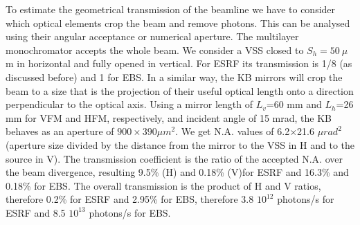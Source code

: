 \documentclass{iucr}              %
\newcommand{\todo}[1]{{\color{red}[TODO: "#1'']}}
\begin{document}
To estimate the geometrical transmission of the beamline we have to consider which optical elements crop the beam and remove photons. This can be analysed using their angular acceptance or numerical aperture. The multilayer monochromator accepts the whole beam. We consider a VSS closed to $S_h=50~\mu$m in horizontal and fully opened in vertical. For ESRF its transmission is 1/8 (as discussed before) and 1 for EBS. In a similar way, the KB mirrors will crop the beam to a size that is the projection of their useful optical length onto a direction perpendicular to the optical axis. Using a mirror length of $L_v$=60 mm and $L_h$=26 mm for VFM and HFM, respectively, and incident angle of 15 mrad, the KB behaves as an aperture of $900 \times 390 \mu m^2$. We get N.A. values of 6.2$\times$21.6 $\mu rad^2$ (aperture size divided by the distance from the mirror to the VSS in H and to the source in V). The transmission coefficient is the ratio of the accepted N.A. over the beam divergence, resulting 9.5\% (H) and 0.18\% (V)for ESRF and 16.3\% and 0.18\% for EBS. The overall transmission is the product of H and V ratios, therefore 0.2\% for ESRF and 2.95\% for EBS, therefore 3.8 $10^{12}$ photons/s for ESRF and 8.5 $10^{13}$ photons/s for EBS. 
\end{document}
